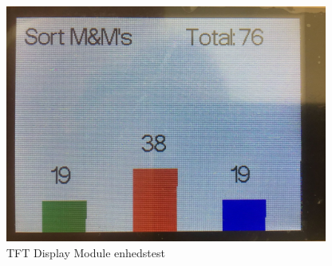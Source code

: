 \begin{figure}[H]
	\centering
	\includegraphics[width = 300pt]{Img/TFT_Display_Module_test.jpg}
	\caption{TFT Display Module enhedstest}
	\label{fig:TFT_Display_Module_test}
\end{figure}
